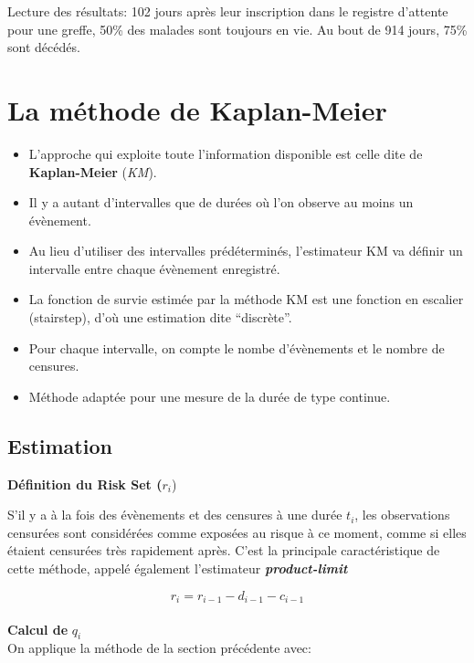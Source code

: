 \documentclass[
  12pt,
  letterpaper,
  DIV=11,
  numbers=noendperiod,
  onepage,
  openany]{scrreprt}
\providecommand{\tightlist}{%
  \setlength{\itemsep}{0pt}\setlength{\parskip}{0pt}}\usepackage{longtable,booktabs,array}
\begin{document}
Lecture des résultats: 102 jours après leur inscription dans le registre
d'attente pour une greffe, 50\% des malades sont toujours en vie. Au
bout de 914 jours, 75\% sont décédés.

\hypertarget{la-muxe9thode-de-kaplan-meier}{%
\section{\texorpdfstring{\textbf{La méthode de
Kaplan-Meier}}{La méthode de Kaplan-Meier}}\label{la-muxe9thode-de-kaplan-meier}}

\begin{itemize}
\tightlist
\item
  L'approche qui exploite toute l'information disponible est celle dite
  de \textbf{Kaplan-Meier} (\emph{KM}).
\item
  Il y a autant d'intervalles que de durées où l'on observe au moins un
  évènement.
\item
  Au lieu d'utiliser des intervalles prédéterminés, l'estimateur KM va
  définir un intervalle entre chaque évènement enregistré.
\item
  La fonction de survie estimée par la méthode KM est une fonction en
  escalier (stairstep), d'où une estimation dite ``discrète''.
\item
  Pour chaque intervalle, on compte le nombe d'évènements et le nombre
  de censures.
\item
  Méthode adaptée pour une mesure de la durée de type continue.
\end{itemize}

\hypertarget{estimation-1}{%
\subsection{Estimation}\label{estimation-1}}

\textbf{Définition du Risk Set (}\(r_i\))

S'il y a à la fois des évènements et des censures à une durée \(t_i\),
les observations censurées sont considérées comme exposées au risque à
ce moment, comme si elles étaient censurées très rapidement après. C'est
la principale caractéristique de cette méthode, appelé également
l'estimateur \textbf{\emph{product-limit}}

\[r_i=r_{i-1}-d_{i-1}-c_{i-1}\]\\

\textbf{Calcul de} \(q_i\)\\
On applique la méthode de la section précédente avec:
\end{document}
